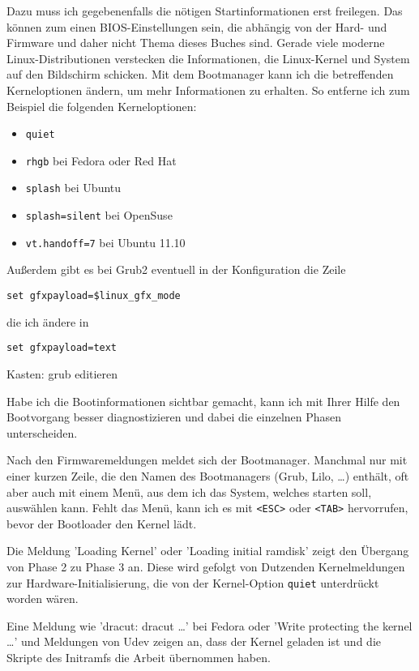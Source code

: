 Dazu muss ich gegebenenfalls die nötigen Startinformationen erst freilegen.
Das können zum einen BIOS-Einstellungen sein, die abhängig von der Hard- und
Firmware und daher nicht Thema dieses Buches sind. Gerade viele moderne
Linux-Distributionen verstecken die Informationen, die Linux-Kernel und System
auf den Bildschirm schicken. Mit dem Bootmanager kann ich die betreffenden
Kerneloptionen ändern, um mehr Informationen zu erhalten. So entferne ich zum
Beispiel die folgenden Kerneloptionen:
\begin{itemize}
  \item \verb?quiet?
  \item \verb?rhgb? bei Fedora oder Red Hat
  \item \verb?splash? bei Ubuntu
  \item \verb?splash=silent? bei OpenSuse
  \item \verb?vt.handoff=7? bei Ubuntu 11.10
\end{itemize}

Außerdem gibt es bei Grub2 eventuell in der Konfiguration die Zeile
\begin{verbatim}
set gfxpayload=$linux_gfx_mode
\end{verbatim}
die ich ändere in
\begin{verbatim}
set gfxpayload=text
\end{verbatim}

\begin{notes}
\item Kasten: grub editieren
\end{notes}

Habe ich die Bootinformationen sichtbar gemacht, kann ich mit Ihrer Hilfe den
Bootvorgang besser diagnostizieren und dabei die einzelnen Phasen
unterscheiden.

Nach den Firmwaremeldungen meldet sich der Bootmanager. Manchmal nur mit einer
kurzen Zeile, die den Namen des Bootmanagers (Grub, Lilo, \ldots) enthält, oft
aber auch mit einem Menü, aus dem ich das System, welches starten soll,
auswählen kann.
Fehlt das Menü, kann ich es mit \verb?<ESC>? oder \verb?<TAB>? hervorrufen,
bevor der Bootloader den Kernel lädt.

Die Meldung 'Loading Kernel' oder 'Loading initial ramdisk' zeigt den Übergang
von Phase 2 zu Phase 3 an.
Diese wird gefolgt von Dutzenden Kernelmeldungen zur Hardware-Initialisierung,
die von der Kernel-Option \verb?quiet? unterdrückt worden wären.

Eine Meldung wie 'dracut: dracut \ldots' bei Fedora oder 'Write protecting the
kernel \ldots' und Meldungen von Udev zeigen an, dass der Kernel geladen ist
und die Skripte des Initramfs die Arbeit übernommen haben.

